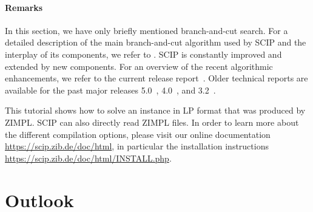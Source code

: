 \documentclass[a4paper,10pt]{article}
\begin{document}
\paragraph{Remarks}

In this section, we have only briefly mentioned branch-and-cut search.
%
For a detailed description of the main branch-and-cut algorithm used by SCIP and the interplay of its components, we refer to
\cite{Achterberg2007}.
%
SCIP is constantly improved and extended by new components.
%
For an overview of the recent algorithmic enhancements, we refer to the current release report~\cite{SCIP6}.
%
Older technical reports are available for the past major releases 5.0~\cite{SCIP5}, 4.0~\cite{SCIP4}, and 3.2~\cite{SCIP32}.

This tutorial shows how to solve an instance in LP format that was produced by ZIMPL.
%
SCIP can also directly read ZIMPL files.
%
In order to learn more about the different compilation options, please visit our online documentation \url{https://scip.zib.de/doc/html},
in particular the installation instructions \url{https://scip.zib.de/doc/html/INSTALL.php}.

\section{Outlook}


\cite{*}




\end{document}
